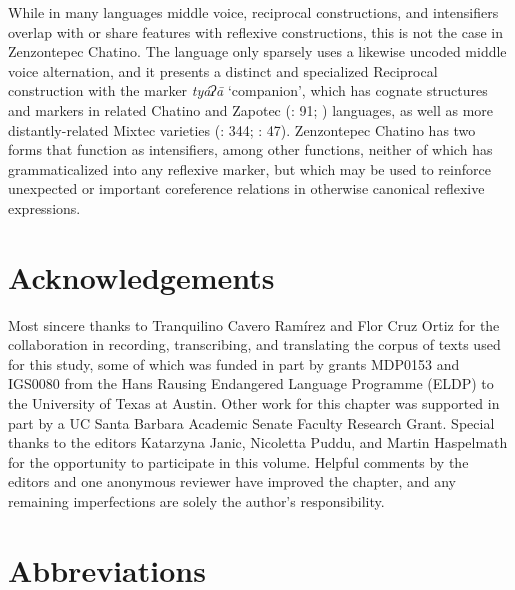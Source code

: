 \documentclass[output=paper]{../langscibook}
\begin{document}
While in many languages middle voice, reciprocal constructions, and intensifiers overlap with or share features with reflexive constructions, this is not the case in Zenzontepec Chatino. The language only sparsely uses a likewise uncoded middle voice alternation, and it presents a distinct and specialized Reciprocal construction with the marker \textit{tyáʔā} ‘companion’, which has cognate structures and markers in related Chatino \citep[71]{Rasch2002} and Zapotec (\citealt{Lee1999}: 91; \citealt{Munro2015}) languages, as well as more distantly-related Mixtec varieties (\citealt{Shields1988}: 344; \citealt{Zylstra1991}: 47). Zenzontepec Chatino has two forms that function as intensifiers, among other functions, neither of which has grammaticalized into any reflexive marker, but which may be used to reinforce unexpected or important coreference relations in otherwise canonical reflexive expressions.


\section*{Acknowledgements}

Most sincere thanks to Tranquilino Cavero Ramírez and Flor Cruz Ortiz for the collaboration in recording, transcribing, and translating the corpus of texts used for this study, some of which was funded in part by grants MDP0153 and IGS0080 from the Hans Rausing Endangered Language Programme (ELDP) to the University of Texas at Austin. Other work for this chapter was supported in part by a UC Santa Barbara Academic Senate Faculty Research Grant. Special thanks to the editors Katarzyna Janic, Nicoletta Puddu, and Martin Haspelmath for the opportunity to participate in this volume. Helpful comments by the editors and one anonymous reviewer have improved the chapter, and any remaining imperfections are solely the author’s responsibility.


\section*{Abbreviations}
\end{document}
